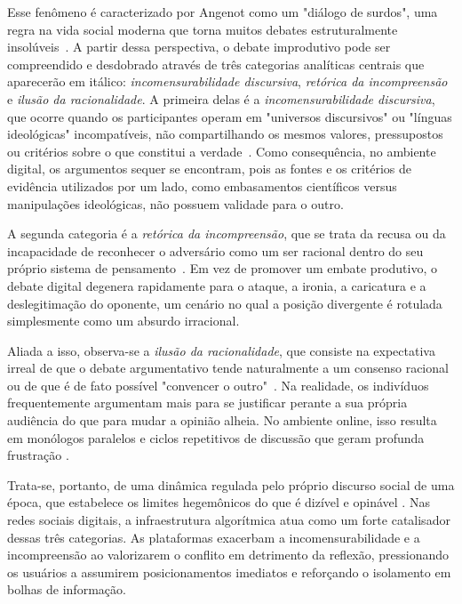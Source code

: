 \documentclass[conference]{IEEEtran} \IEEEoverridecommandlockouts %
\begin{document}
Esse fenômeno é caracterizado por Angenot como um "diálogo de surdos", uma regra na vida social moderna que torna muitos debates estruturalmente insolúveis~\cite{angenot2008dialogues}. A partir dessa perspectiva, o debate improdutivo pode ser compreendido e desdobrado através de três categorias analíticas centrais que aparecerão em itálico: \textit{incomensurabilidade discursiva}, \textit{retórica da incompreensão} e \textit{ilusão da racionalidade}. A primeira delas é a \textit{incomensurabilidade discursiva}, que ocorre quando os participantes operam em "universos discursivos" ou "línguas ideológicas" incompatíveis, não compartilhando os mesmos valores, pressupostos ou critérios sobre o que constitui a verdade~\cite{angenot2006divergent}. Como consequência, no ambiente digital, os argumentos sequer se encontram, pois as fontes e os critérios de evidência utilizados por um lado, como embasamentos científicos versus manipulações ideológicas, não possuem validade para o outro.

A segunda categoria é a \textit{retórica da incompreensão}, que se trata da recusa ou da incapacidade de reconhecer o adversário como um ser racional dentro do seu próprio sistema de pensamento~\cite{angenot2008dialogues}. Em vez de promover um embate produtivo, o debate digital degenera rapidamente para o ataque, a ironia, a caricatura e a deslegitimação do oponente, um cenário no qual a posição divergente é rotulada simplesmente como um absurdo irracional.

Aliada a isso, observa-se a \textit{ilusão da racionalidade}, que consiste na expectativa irreal de que o debate argumentativo tende naturalmente a um consenso racional ou de que é de fato possível "convencer o outro"~\cite{angenot2008dialogues}. Na realidade, os indivíduos frequentemente argumentam mais para se justificar perante a sua própria audiência do que para mudar a opinião alheia. No ambiente online, isso resulta em monólogos paralelos e ciclos repetitivos de discussão que geram profunda frustração .

Trata-se, portanto, de uma dinâmica regulada pelo próprio discurso social de uma época, que estabelece os limites hegemônicos do que é dizível e opinável \cite{angenot2010discurso}. Nas redes sociais digitais, a infraestrutura algorítmica atua como um forte catalisador dessas três categorias. As plataformas exacerbam a incomensurabilidade e a incompreensão ao valorizarem o conflito em detrimento da reflexão, pressionando os usuários a assumirem posicionamentos imediatos e reforçando o isolamento em bolhas de informação.
\end{document}
